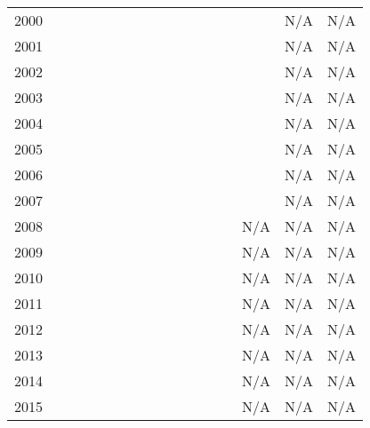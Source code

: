 \begin{center}
\begin{tabular}{c|cccccccccccccccc}
        2000 &       &       &       &       &       &       &       &       &    &    &    &       &       &     & N/A & N/A \\
        2001 &       &       &       &       &       &       &       &       &    &    &    &       &       &     & N/A & N/A \\
        2002 &       &       &       &       &       &       &       &       &    &    &    &       &       &     & N/A & N/A \\
        2003 &       &       &       &       &       &       &       &       &    &    &    &       &       &     & N/A & N/A \\
        2004 &       &       &       &       &       &       &       &       &    &    &    &       &       &     & N/A & N/A \\
        2005 &       &       &       &       &       &       &       &       &    &    &    &       &       &     & N/A & N/A \\
        2006 &       &       &       &       &       &       &       &       &    &    &    &       &       &     & N/A & N/A \\
        2007 &       &       &       &       &       &       &       &       &    &    &    &       &       &     & N/A & N/A \\
        2008 &       &       &       &       &       &       &       &       &    &    &    &       &       & N/A & N/A & N/A \\
        2009 &       &       &       &       &       &       &       &       &    &    &    &       &       & N/A & N/A & N/A \\
        2010 &       &       &       &       &       &       &       &       &    &    &    &       &       & N/A & N/A & N/A \\
        2011 &       &       &       &       &       &       &       &       &    &    &    &       &       & N/A & N/A & N/A \\
        2012 &       &       &       &       &       &       &       &       &    &    &    &       &       & N/A & N/A & N/A \\
        2013 &       &       &       &       &       &       &       &       &    &    &    &       &       & N/A & N/A & N/A \\
        2014 &       &       &       &       &       &       &       &       &    &    &    &       &       & N/A & N/A & N/A \\
        2015 &       &       &       &       &       &       &       &       &    &    &    &       &       & N/A & N/A & N/A \\

\end{tabular}
\end{center}
